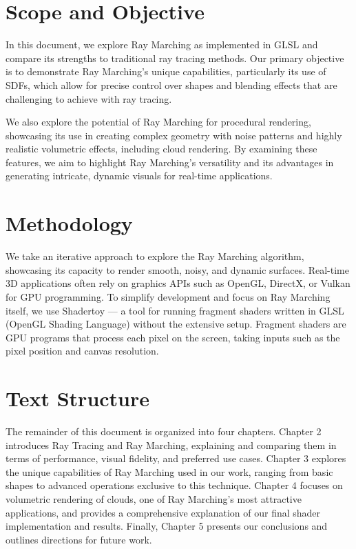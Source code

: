 
\section{Scope and Objective}

In this document, we explore Ray Marching as implemented in GLSL and compare its strengths to traditional ray tracing methods. Our primary objective is to demonstrate Ray Marching's unique capabilities, particularly its use of SDFs, which allow for precise control over shapes and blending effects that are challenging to achieve with ray tracing.


We also explore the potential of Ray Marching for procedural rendering, showcasing its use in creating complex geometry with noise patterns and highly realistic volumetric effects, including cloud rendering. By examining these features, we aim to highlight Ray Marching’s versatility and its advantages in generating intricate, dynamic visuals for real-time applications.

\section{Methodology}

We take an iterative approach to explore the Ray Marching algorithm, showcasing its capacity to render smooth, noisy, and dynamic surfaces. Real-time 3D applications often rely on graphics APIs such as OpenGL, DirectX, or Vulkan for GPU programming. To simplify development and focus on Ray Marching itself, we use Shadertoy — a tool for running fragment shaders written in GLSL (OpenGL Shading Language) without the extensive setup. Fragment shaders are GPU programs that process each pixel on the screen, taking inputs such as the pixel position and canvas resolution.

\section{Text Structure}

The remainder of this document is organized into four chapters.  
Chapter 2 introduces Ray Tracing and Ray Marching, explaining and comparing them in terms of performance, visual fidelity, and preferred use cases.  
Chapter 3 explores the unique capabilities of Ray Marching used in our work, ranging from basic shapes to advanced operations exclusive to this technique.  
Chapter 4 focuses on volumetric rendering of clouds, one of Ray Marching’s most attractive applications, and provides a comprehensive explanation of our final shader implementation and results.  
Finally, Chapter 5 presents our conclusions and outlines directions for future work.